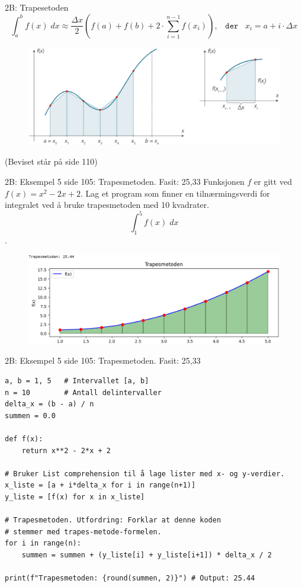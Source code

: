 \redheader
\begin{frame}{2B: Trapesetoden}
 \begin{equation*}
        \int_a^b f(x)\;dx\approx\frac{\Delta x}{2}\left(f(a)+f(b)+2\cdot \sum_{i=1}^{n-1}f(x_i)\right),\;\;\;\texttt{der}\;\;\; x_i=a+i\cdot \Delta x
    \end{equation*}
     \begin{figure}
        \centering
   \includegraphics[width=0.8\linewidth]{R2-K2B-9.png}
    \end{figure}
(Beviset står på side 110)
\end{frame}


\greenheader
\begin{frame}{2B: Eksempel 5 side 105: Trapesmetoden. Fasit: 25,33}
Funksjonen $f$ er gitt ved $f(x)=x^2-2x+2$. Lag et program som finner en tilnærmingsverdi for integralet ved å bruke trapesmetoden med 10 kvadrater.
\[
\int_1^5f(x)\;dx
\].
\begin{figure}
    \centering
    \includegraphics[width=0.9\linewidth]{R2-K2B-10.png}
\end{figure}
\end{frame}


\greenheader
\begin{frame}[fragile]{2B: Eksempel 5 side 105: Trapesmetoden. Fasit: 25,33}
\begin{verbatim}
a, b = 1, 5   # Intervallet [a, b]
n = 10        # Antall delintervaller
delta_x = (b - a) / n
summen = 0.0

def f(x):
    return x**2 - 2*x + 2

# Bruker List comprehension til å lage lister med x- og y-verdier. 
x_liste = [a + i*delta_x for i in range(n+1)]
y_liste = [f(x) for x in x_liste]

# Trapesmetoden. Utfordring: Forklar at denne koden 
# stemmer med trapes-metode-formelen.
for i in range(n): 
    summen = summen + (y_liste[i] + y_liste[i+1]) * delta_x / 2

print(f"Trapesmetoden: {round(summen, 2)}") # Output: 25.44
\end{verbatim}
\end{frame}


